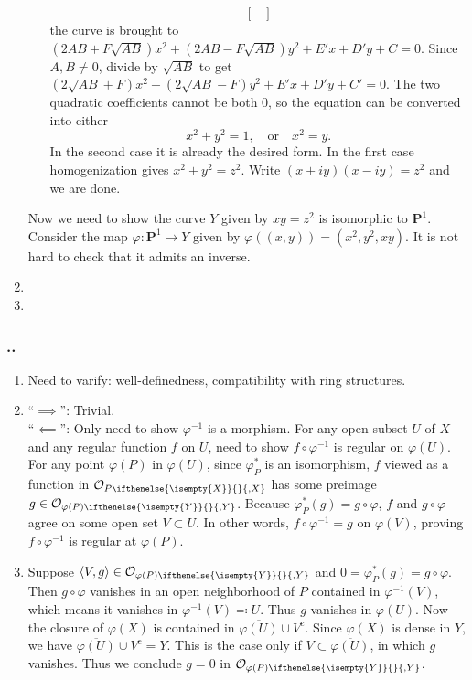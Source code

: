\documentclass{note}
\newcounter{exercise}[section]
\newcommand{\Ex}{%
    \stepcounter{exercise}%
    \subsubsection*{\thesection.\arabic{exercise}.}%
}
\newcommand{\Proj}[1]{\mathbf{P}^{#1}}
\newcommand{\lring}[2][]{\mathcal{O}_{#2\ifthenelse{\isempty{#1}}{}{,#1}}}
\newcommand{\union}{\cup}
\newcommand{\closure}{\overline}
\newcommand{\cmpl}[1]{#1^\text{c}}
\newcommand{\chevrons}[1]{\left\langle#1\right\rangle}
\begin{document}
\begin{enumerate}
\begin{itemize}
\begin{equation*}
\begin{bmatrix}
                  \end{bmatrix}
                \end{equation*}
                the curve is brought to $(2AB + F\sqrt{AB})x^2 + (2AB -
                F\sqrt{AB})y^2 + E'x + D'y + C = 0$. Since $A,B\ne0$, divide by
                $\sqrt{AB}$ to get $(2\sqrt{AB} + F)x^2 + (2\sqrt{AB} - F)y^2 + E'x
                + D'y + C' = 0$. The two quadratic coefficients cannot be both 0, so
                the equation can be converted into either
                \begin{equation*}
                  x^2 + y^2 = 1, \quad \text{or} \quad x^2 = y.
                \end{equation*}
                In the second case it is already the desired form. In the first case
                homogenization gives $x^2 + y^2 = z^2$. Write $(x + iy)(x - iy) =
                z^2$ and we are done.
        \end{itemize}
        Now we need to show the curve $Y$ given by $xy = z^2$ is isomorphic to
        $\Proj{1}$. Consider the map $\varphi\colon\Proj{1} \to Y$ given by
        $\varphi((x,y)) = (x^2,y^2,xy)$. It is not hard to check that it admits an
        inverse.
  \item
  \item
\end{enumerate}

\setcounter{exercise}{2}

\Ex
\begin{enumerate}
  \item Need to varify: well-definedness, compatibility with ring structures.
  \item ``$\implies$'': Trivial.\\ ``$\impliedby$'': Only need to
        show $\varphi^{-1}$ is a morphism. For any open subset $U$ of $X$ and any
        regular function $f$ on $U$, need to show $f\circ\varphi^{-1}$ is regular on
        $\varphi(U)$. For any point $\varphi(P)$ in $\varphi(U)$, since $\varphi_P^*$
        is an isomorphism, $f$ viewed as a function in $\lring[X]{P}$ has some preimage
        $g\in\lring[Y]{\varphi(P)}$. Because $\varphi_P^*(g) = g\circ\varphi$, $f$ and
        $g\circ\varphi$ agree on some open set $V\subset U$. In other words,
        $f\circ\varphi^{-1} = g$ on $\varphi(V)$, proving $f\circ\varphi^{-1}$ is
        regular at $\varphi(P)$.
  \item Suppose $\chevrons{V,g}\in\lring[Y]{\varphi(P)}$ and $0 = \varphi_P^*(g) =
        g\circ\varphi$. Then $g\circ\varphi$ vanishes in an open neighborhood of $P$
        contained in $\varphi^{-1}(V)$, which means it vanishes in
        $\varphi^{-1}(V)\eqqcolon U$. Thus $g$ vanishes in $\varphi(U)$. Now the
        closure of $\varphi(X)$ is contained in
        $\closure{\varphi(U)}\union\cmpl{V}$. Since $\varphi(X)$ is dense in $Y$, we
        have $\closure{\varphi(U)}\union\cmpl{V} = Y$. This is the case only if
        $V\subset\closure{\varphi(U)}$, in which $g$ vanishes. Thus we conclude $g =
        0$ in $\lring[Y]{\varphi(P)}$.
\end{enumerate}
\end{document}
